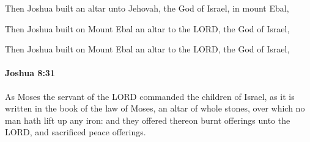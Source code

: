 			\begin{versebox}
					\item[BHS] 
					\item[ASV] Then Joshua built an altar unto Jehovah, the God of Israel, in mount Ebal,
					\item[NIV] Then Joshua built on Mount Ebal an altar to the LORD, the God of Israel,
					\item[NRSV] Then Joshua built on Mount Ebal an altar to the LORD, the God of Israel,
			\end{versebox}

		\paragraph{Joshua 8:31} %
			\label{JOSHUA-8-31}

			As Moses the servant of the LORD commanded the children of Israel, as it is written in the book of the law of Moses, an altar of whole stones, over which no man hath lift up any iron: and they offered thereon burnt offerings unto the LORD, and sacrificed peace offerings.

